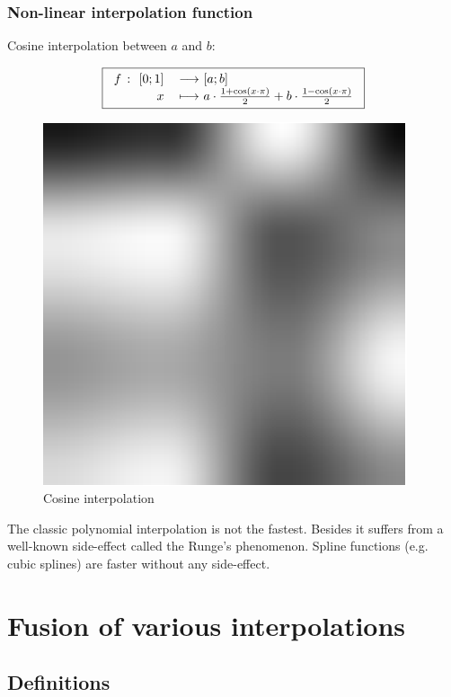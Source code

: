 \documentclass[10pt,a4paper]{article}
\newcommand{\function}[5]{
  \begin{tabular}{rl}
    #1 $\colon$ #2 & $\longrightarrow$ #3 \\
    #4             & $\longmapsto$     #5
  \end{tabular}
}
\begin{document}
\subsubsection{Non-linear interpolation function}

Cosine interpolation between $a$ and $b$:

\[\boxed{
  \function{$f$}{$[0;1]$}{$[a;b]$}{$x$}{$a \cdot \frac {1+\cos(x\cdot\pi)} {2} + b \cdot \frac {1-\cos(x\cdot\pi)} {2}$}
}\]

\begin{figure}[p]
  \centering
  \caption{Cosine interpolation}
  \bigskip
  \includegraphics{interpol_cos}
\end{figure}

The classic polynomial interpolation is not the fastest. Besides it suffers from
a well-known side-effect called the Runge's phenomenon. Spline functions
(e.g. cubic splines) are faster without any side-effect.

\section{Fusion of various interpolations}

\subsection{Definitions}
\end{document}
